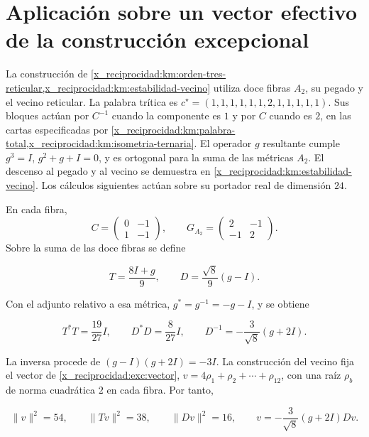 \section{Aplicación sobre un vector efectivo de la construcción excepcional}

La construcción de
\cref{x_reciprocidad:km:orden-tres-reticular,x_reciprocidad:km:estabilidad-vecino}
utiliza doce fibras \(A_2\), su pegado y el vecino reticular.
La palabra trítica es
\(c^\star=(1,1,1,1,1,1,2,1,1,1,1,1)\).
Sus bloques actúan por \(C^{-1}\) cuando la componente es \(1\)
y por \(C\) cuando es \(2\), en las cartas especificadas por
\cref{x_reciprocidad:km:palabra-total,x_reciprocidad:km:isometria-ternaria}.
El operador \(g\) resultante cumple
\(g^3=I\), \(g^2+g+I=0\), y es ortogonal para la suma de las
métricas \(A_2\).
El descenso al pegado y al vecino se demuestra en
\cref{x_reciprocidad:km:estabilidad-vecino}.
Los cálculos siguientes actúan sobre su portador real de
dimensión \(24\).

En cada fibra,
\[
 C=\begin{pmatrix}0&-1\\1&-1\end{pmatrix},
 \qquad
 G_{A_2}=\begin{pmatrix}2&-1\\-1&2\end{pmatrix}.
\]
Sobre la suma de las doce fibras se define



\[
T=\frac{8I+g}{9},\qquad D=\frac{\sqrt8}{9}(g-I).
\]



Con el adjunto relativo a esa métrica,
\(g^*=g^{-1}=-g-I\), y se obtiene



\begin{equation}
T^*T=\frac{19}{27}I,
\qquad D^*D=\frac8{27}I,
\qquad D^{-1}=-\frac3{\sqrt8}(g+2I).
\label{x_reciprocidad:nuc11:eq:18}
\end{equation}



La inversa procede de \((g-I)(g+2I)=-3I\).
La construcción del vecino fija el vector de
\eqref{x_reciprocidad:exc:vector},
\(v=4\rho_1+\rho_2+\cdots+\rho_{12}\), con una raíz
\(\rho_b\) de norma cuadrática \(2\) en cada fibra.
Por tanto,



\begin{equation}
\|v\|^2=54,\qquad \|Tv\|^2=38,\qquad \|Dv\|^2=16,
\qquad v=-\frac3{\sqrt8}(g+2I)Dv.
\label{x_reciprocidad:nuc11:eq:19}
\end{equation}



